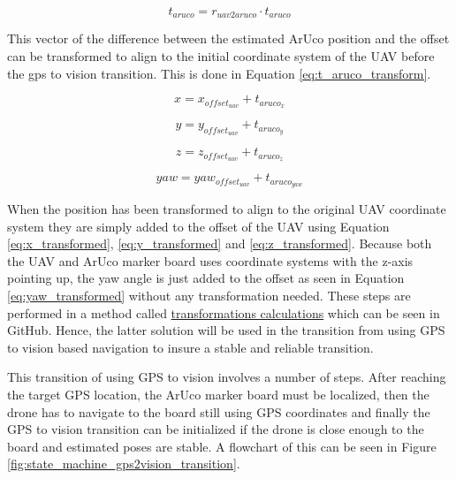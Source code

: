 \documentclass[../Head/report.tex]{subfiles}
\begin{document}
\begin{equation}
	t_{aruco} = r_{uav2aruco} \cdot t_{aruco}
	\label{eq:t_aruco_transform}
\end{equation}

This vector of the difference between the estimated ArUco position and the offset can be transformed to align to the initial coordinate system of the UAV before the gps to vision transition. This is done in Equation \ref{eq:t_aruco_transform}. 

\begin{equation}
	x = x_{offset_{uav}} + t_{aruco_{x}}
	\label{eq:x_transformed}
\end{equation}

\begin{equation}
	y = y_{offset_{uav}} + t_{aruco_{y}}
	\label{eq:y_transformed}
\end{equation}

\begin{equation}
	z = z_{offset_{uav}} + t_{aruco_{z}}
	\label{eq:z_transformed}
\end{equation}

\begin{equation}
	yaw = yaw_{offset_{uav}} + t_{aruco_{yaw}}
	\label{eq:yaw_transformed}
\end{equation}

When the position has been transformed to align to the original UAV coordinate system they are simply added to the offset of the UAV using Equation \ref{eq:x_transformed},  \ref{eq:y_transformed} and  \ref{eq:z_transformed}. Because both the UAV and ArUco marker board uses coordinate systems with the z-axis pointing up, the yaw angle is just added to the offset as seen in Equation \ref{eq:yaw_transformed} without any transformation needed. These steps are performed in a method called \href{https://github.com/Kenil16/master_project/blob/master/software/ros_workspace/src/offboard_control/transformations_calculations.py} {transformations calculations} which can be seen in GitHub. Hence, the latter solution will be used in the transition from using GPS to vision based navigation to insure a stable and reliable transition. 

This transition of using GPS to vision involves a number of steps. After reaching the target GPS location, the ArUco marker board must be localized, then the drone has to navigate to the board still using GPS coordinates and finally the GPS to vision transition can be initialized if the drone is close enough to the board and estimated poses are stable. A flowchart of this can be seen in Figure \ref{fig:state_machine_gps2vision_transition}. 
\end{document}
